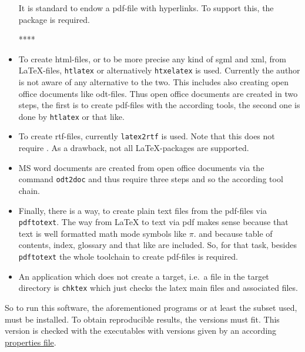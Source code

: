\begin{itemize}
It is standard to endow a pdf-file with hyperlinks. 
To support this, the package  is required. 

****
\item
To create \gls{html}-files, 
or to be more precise any kind of \gls{sgml} and \gls{xml}, 
from \LaTeX-files, \texttt{htlatex} or alternatively \texttt{htxelatex} is used. 
Currently the author is not aware of any alternative to the two. 
This includes also creating open office documents like odt-files. 
Thus open office documents are created in two steps, 
the first is to create pdf-files with the according tools, 
the second one is done by \texttt{htlatex} or that like. 
\item
To create rtf-files, currently \texttt{latex2rtf} is used. 
Note that this does not require \pdflatex. 
As a drawback, not all \LaTeX-packages are supported. 
\item
MS word documents are created from open office documents 
via the command \texttt{odt2doc} and thus require three steps 
and so the according tool chain. 
\item
Finally, there is a way, to create plain text files from the pdf-files 
via \texttt{pdftotext}. 
The way from \LaTeX{} to text via pdf makes sense 
because that text is well formatted math mode symbols like $\pi$. 
and because table of contents, index, glossary and that like are included. 
So, for that task, besides \texttt{pdftotext} the whole toolchain to create
pdf-files is required. 
\item
An application which does not create a target, 
i.e.~a file in the target directory is \texttt{chktex} 
which just checks the latex main files and associated files. 
\end{itemize}

So to run this software, the aforementioned programs 
or at least the subset used, must be installed.
To obtain reproducible results, the versions must fit.
This version is checked with the executables with versions given by 
an according \href{\urlSite fromMain/version.properties}{properties file}. 



